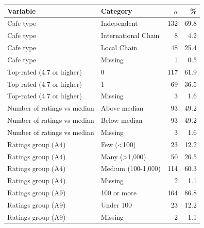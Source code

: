 \begin{tabular}{p{4.6cm}p{4.2cm}rr}
\toprule
Variable & Category & $n$ & \% \\
\midrule
Cafe type & Independent & 132 & 69.8 \\
Cafe type & International Chain & 8 & 4.2 \\
Cafe type & Local Chain & 48 & 25.4 \\
Cafe type & Missing & 1 & 0.5 \\
Top-rated (4.7 or higher) & 0 & 117 & 61.9 \\
Top-rated (4.7 or higher) & 1 & 69 & 36.5 \\
Top-rated (4.7 or higher) & Missing & 3 & 1.6 \\
Number of ratings vs median & Above median & 93 & 49.2 \\
Number of ratings vs median & Below median & 93 & 49.2 \\
Number of ratings vs median & Missing & 3 & 1.6 \\
Ratings group (A4) & Few (\textless{}100) & 23 & 12.2 \\
Ratings group (A4) & Many (\textgreater{}1,000) & 50 & 26.5 \\
Ratings group (A4) & Medium (100-1,000) & 114 & 60.3 \\
Ratings group (A4) & Missing & 2 & 1.1 \\
Ratings group (A9) & 100 or more & 164 & 86.8 \\
Ratings group (A9) & Under 100 & 23 & 12.2 \\
Ratings group (A9) & Missing & 2 & 1.1 \\
\bottomrule
\end{tabular}

